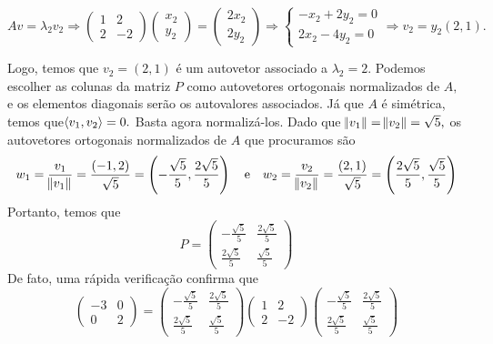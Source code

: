 \documentclass[11pt,a4paper]{article}
\begin{document}
{{\[
Av=  \lambda_2 v_2 \Rightarrow \begin{pmatrix}
1 & 2 \\
2 & -2
\end{pmatrix} \begin{pmatrix}
x_2 \\ y_2
\end{pmatrix} =  \begin{pmatrix}
2x_2 \\ 2y_2
\end{pmatrix} \Rightarrow \begin{cases}
-x_2+2y_2 = 0 \\
2x_2 - 4y_2 = 0
\end{cases} \Rightarrow v_2 = y_2 \left(2, 1 \right).
\]

Logo, temos que $v_2 = (2,1)$ é um autovetor associado a $\lambda_2 = 2.$ 
Podemos escolher as colunas da matriz $P$ como autovetores ortogonais normalizados de $A,$ e os elementos diagonais serão os autovalores associados.
Já que $A$ é simétrica, temos que$\left\langle v_1, v_2 \right\rangle = 0.$ Basta agora normalizá-los. Dado que $\norm{v_1} = \norm{v_2} = \sqrt{5},$ os autovetores ortogonais normalizados de $A$ que procuramos são
\[
w_1 = \frac{v_1}{\norm{v_1}} = \frac{(-1,2)}{\sqrt{5}} = \left(-\frac{\sqrt{5}}{5}, \frac{2 \sqrt{5}}{5} \right) \quad \mbox{e} \quad w_2 = \frac{v_2}{\norm{v_2}} = \frac{(2,1)}{\sqrt{5}} = \left(\frac{2\sqrt{5}}{5}, \frac{ \sqrt{5}}{5} \right) 
\]
Portanto, temos que
\[
P = \begin{pmatrix}
-\frac{\sqrt{5}}{5} & \frac{2\sqrt{5}}{5} \\
\frac{2 \sqrt{5}}{5} & \frac{\sqrt{5}}{5} 
\end{pmatrix}
\]
De fato, uma rápida verificação confirma que
\[
 \begin{pmatrix}
-3 & 0 \\
0 & 2
\end{pmatrix} = \begin{pmatrix}
-\frac{\sqrt{5}}{5} & \frac{2\sqrt{5}}{5} \\
\frac{2 \sqrt{5}}{5} & \frac{\sqrt{5}}{5} 
\end{pmatrix}
 \begin{pmatrix}
1 & 2 \\
2 & -2
\end{pmatrix}
\begin{pmatrix}
-\frac{\sqrt{5}}{5} & \frac{2\sqrt{5}}{5} \\
\frac{2 \sqrt{5}}{5} & \frac{\sqrt{5}}{5} 
\end{pmatrix}
\]

}}
\end{document}
